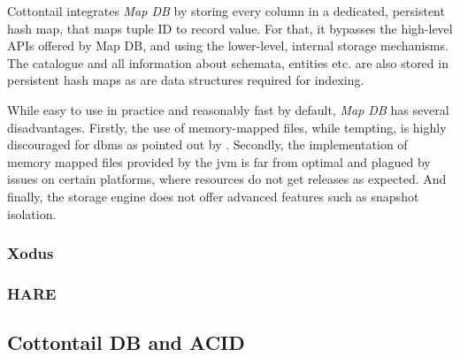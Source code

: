 Cottontail integrates \emph{Map DB} by storing every column in a dedicated, persistent hash map, that maps tuple ID to record value. For that, it bypasses the high-level APIs offered by Map DB, and using the lower-level, internal storage mechanisms. The catalogue and all information about schemata, entities etc. are also stored in persistent hash maps as are data structures required for indexing.

While easy to use in practice and reasonably fast by default, \emph{Map DB} has several disadvantages. Firstly, the use of memory-mapped files, while tempting, is highly discouraged for \acrshort{dbms} as pointed out by \cite{Crotty:2022Are}. Secondly, the implementation of memory mapped files provided by the \acrshort{jvm} is far from optimal and plagued by issues on certain platforms, where resources do not get releases as expected. And finally, the storage engine does not offer advanced features such as snapshot isolation.

\subsubsection{Xodus}

\subsubsection{HARE}

\subsection{Cottontail DB and ACID}
